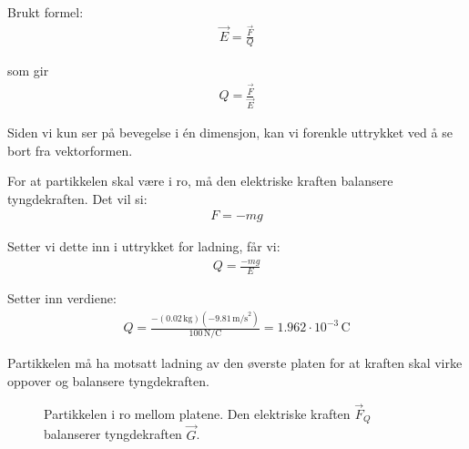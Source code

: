 \subsubsection{}

Brukt formel:
\begin{align}
\vec{E} = \frac{\vec{F}}{Q}
\end{align}

som gir
\begin{align}
Q = \frac{\vec{F}}{\vec{E}}
\end{align}

Siden vi kun ser på bevegelse i én dimensjon, kan vi forenkle uttrykket ved å se bort fra vektorformen.

For at partikkelen skal være i ro, må den elektriske kraften balansere tyngdekraften. Det vil si:
\begin{align}
F = -mg
\end{align}

Setter vi dette inn i uttrykket for ladning, får vi:
\begin{align}
Q = \frac{-mg}{E}
\end{align}

Setter inn verdiene:
\begin{align}
Q = \frac{-(0.02\,\text{kg})(-9.81\,\text{m/s}^2)}{100\,\text{N/C}} = 1.962 \cdot 10^{-3}\,\text{C}
\end{align}

Partikkelen må ha motsatt ladning av den øverste platen for at kraften skal virke oppover og balansere tyngdekraften.

\begin{figure}[H]
\centering
{}
\caption{Partikkelen i ro mellom platene. Den elektriske kraften $\vec{F}_Q$ balanserer tyngdekraften $\vec{G}$.}
\end{figure}

\newpage